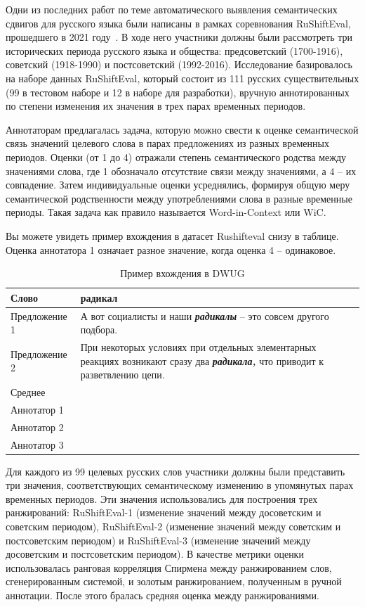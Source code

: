 \documentclass[LI,VKR]{HSEUniversity}
\begin{document}
Одни из последних работ по теме автоматического выявления семантических сдвигов для русского языка
были написаны в рамках соревнования RuShiftEval, прошедшего в 2021 году~\cite{rushifteval}.
В ходе него участники должны были рассмотреть три исторических периода русского языка и общества:
предсоветский (1700-1916), советский (1918-1990) и постсоветский (1992-2016).
Исследование базировалось на наборе данных RuShiftEval, который состоит из
111 русских существительных (99 в тестовом наборе и 12 в наборе для разработки),
вручную аннотированных по степени изменения их значения в трех парах временных периодов.

Аннотаторам предлагалась задача, которую можно свести к оценке семантической связь значений
целевого слова в парах предложениях из разных временных периодов.
Оценки (от 1 до 4) отражали степень семантического родства между значениями слова, где
1 обозначало отсутствие связи между значениями, а 4 – их совпадение.
Затем индивидуальные оценки усреднялись, формируя общую меру семантической родственности между
употреблениями слова в разные временные периоды.
Такая задача как правило называется Word-in-Context или WiC.

Вы можете увидеть пример вхождения в датасет Rushifteval снизу в таблице.
Оценка аннотатора 1 означает разное значение, когда оценка 4 – одинаковое.

\begin{table}[H]
\centering
\caption{Пример вхождения в DWUG}
\begin{tabular}{|>{\raggedright\arraybackslash}p{4cm}|>{\raggedright\arraybackslash}p{10cm}|}
\hline
Слово & радикал \\
\hline
Предложение 1 & А вот социалисты и наши \textbf{\textit{радикалы}} -- это совсем другого подбора. \\
\hline
Предложение 2 & При некоторых условиях при отдельных элементарных реакциях возникают сразу два \textbf{\textit{радикала,}} что приводит к разветвлению цепи. \\
\hline
Среднее & 1.0 \\
\hline
Аннотатор 1 & 1 \\
\hline
Аннотатор 2 & 1 \\
\hline
Аннотатор 3 & 1 \\
\hline
\end{tabular}
\end{table}

Для каждого из 99 целевых русских слов участники должны
были представить три значения, соответствующих семантическому изменению в упомянутых парах
временных периодов.
Эти значения использовались для построения трех ранжирований:
RuShiftEval-1 (изменение значений между досоветским и советским периодом),
RuShiftEval-2 (изменение значений между советским и постсоветским периодом)
и RuShiftEval-3 (изменение значений между досоветским и постсоветским периодом).
В качестве метрики оценки использовалась ранговая корреляция Спирмена между ранжированием слов,
сгенерированным системой, и золотым ранжированием, полученным в ручной аннотации.
После этого бралась средняя оценка между ранжированиями.
\end{document}
